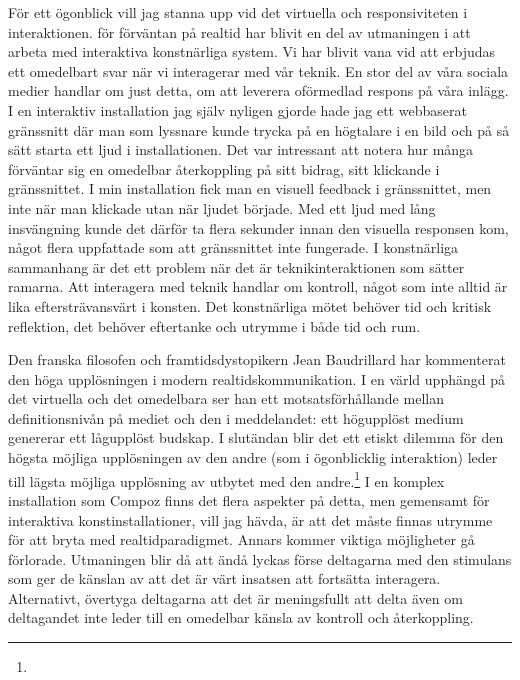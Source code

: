 \documentclass[12pt]{article}
\begin{document}
För ett ögonblick vill jag stanna upp vid det virtuella och responsiviteten i interaktionen. för förväntan på realtid har blivit en del av utmaningen i att arbeta med interaktiva konstnärliga system. Vi har blivit vana vid att erbjudas ett omedelbart svar när vi interagerar med vår teknik. En stor del av våra sociala medier handlar om just detta, om att leverera oförmedlad respons på våra inlägg. I en interaktiv installation jag själv nyligen gjorde hade jag ett webbaserat gränssnitt där man som lyssnare kunde trycka på en högtalare i en bild och på så sätt starta ett ljud i installationen. Det var intressant att notera hur många förväntar sig en omedelbar återkoppling på sitt bidrag, sitt klickande i gränssnittet. I min installation fick man en visuell feedback i gränssnittet, men inte när man klickade utan när ljudet började. Med ett ljud med lång insvängning kunde det därför ta flera sekunder innan den visuella responsen kom, något flera uppfattade som att gränssnittet inte fungerade. I konstnärliga sammanhang är det ett problem när det är teknikinteraktionen som sätter ramarna. Att interagera med teknik handlar om kontroll, något som inte alltid är lika eftersträvansvärt i konsten. Det konstnärliga mötet behöver tid och kritisk reflektion, det behöver eftertanke och utrymme i både tid och rum.

Den franska filosofen och framtidsdystopikern Jean Baudrillard har kommenterat den höga upplösningen i modern realtidskommunikation. I en värld upphängd på det virtuella och det omedelbara ser han ett motsatsförhållande mellan definitionsnivån på mediet och den i meddelandet: ett högupplöst medium genererar ett lågupplöst budskap. I slutändan blir det ett etiskt dilemma för den högsta möjliga upplösningen av den andre (som i ögonblicklig interaktion) leder till lägsta möjliga upplösning av utbytet med den andre.\footnote{} I en komplex installation som Compoz finns det flera aspekter på detta, men gemensamt för interaktiva konstinstallationer, vill jag hävda, är att det måste finnas utrymme för att bryta med realtidparadigmet. Annars kommer viktiga möjligheter gå förlorade. Utmaningen blir då att ändå lyckas förse deltagarna med den stimulans som ger de känslan av att det är värt insatsen att fortsätta interagera. Alternativt, övertyga deltagarna att det är meningsfullt att delta även om deltagandet inte leder till en omedelbar känsla av kontroll och återkoppling.
\end{document}
